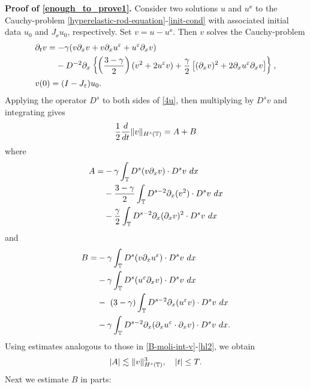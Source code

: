 \textbf{Proof of \eqref{enough_to_prove1}.}
Consider two solutions $u $ and $u^\ee$ to the Cauchy-problem
\eqref{hyperelastic-rod-equation}-\eqref{init-cond}
with associated initial data $u_0$ and
$J_\ee u_0$, respectively. Set $v= u -u^\ee $. Then $v$ solves the
Cauchy-problem
\begin{align}
\label{4u}
& \p_t v  =  - \gamma (v \p_x v + v \p_x u^\ee + u^\ee \p_x v)  \\
& \phantom{ \p_t v  =} - D^{-2} \p_x \left\{ \left (\frac{3-\gamma}{2} \right )(v^2 +
2u^\ee v) + \frac{\gamma}{2}\left[ (\p_x v)^2 + 2 \p_x u^\ee \p_x v \right]
\right\}, \notag
\\
& v(0) = (I- J_\ee)u_0.
\label{5u}
\end{align}
Applying the operator $D^s$ to both sides of \eqref{4u}, then multiplying by
$D^s v$ and integrating gives
%
%
\begin{equation}
\begin{split}
\frac{1}{2}\frac{d}{dt} \|v\|_{H^s(\mathbb{T})} = A + B
\label{6u}
\end{split}
\end{equation}
%
%
where
%
%
\begin{equation}
\begin{split}
A
 =  & -\gamma \int_{\mathbb{T}} D^s(v \partial_x v) \cdot D^s v \
dx
\\
& - \frac{3- \gamma}{2} \int_{\mathbb{T}} D^{s-2} \partial_x (v^2) \cdot D^s v
\ dx
\\
& - \frac{\gamma}{2}\int_{\mathbb{T}} D^{s-2} \partial_x (\partial_x v)^2 \cdot D^s
v \ dx
\label{7u}
\end{split}
\end{equation}
%
%
and
%
%
\begin{equation}
\begin{split}
B = & -\gamma \int_{\mathbb{T}} D^s (v \partial_x u^\varepsilon ) \cdot D^s v \
dx \\
& -\gamma \int_{\mathbb{T}} D^s (u^\varepsilon \partial_x v) \cdot D^s v \
dx
\\
& - \ ( 3- \gamma) \int_{\mathbb{T}} D^{s-2} \partial_x (u^\varepsilon v) \cdot D^s
v \ dx
\\
& -\gamma \int_{\mathbb{T}} D^{s-2} \partial_x
(\partial_x u^\varepsilon \cdot \partial_x v) \cdot D^s v \
dx.
\label{8u}
\end{split}
\end{equation}
%
%
Using estimates analogous to those in 
\eqref{B-moli-int-v}-\eqref{hl2}, we 
obtain 
%
%
\begin{equation}
\begin{split}
|A| \lesssim \|v\|_{H^s(\mathbb{T})}^3, \quad |t| \le T.
\label{8'u}
\end{split}
\end{equation}
%
%
%
Next we estimate $B$ in parts:
%
%
%
%
%

